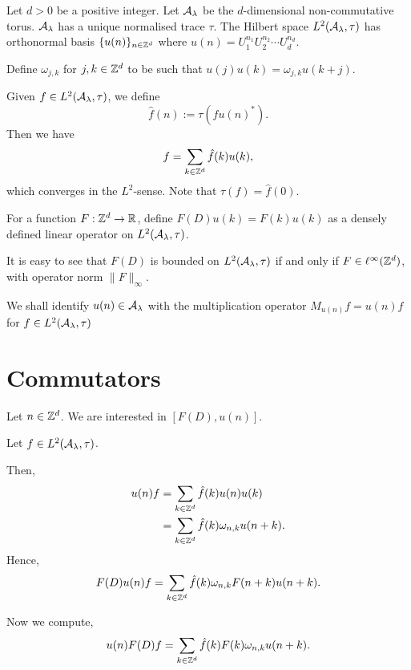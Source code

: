Let $d > 0$ be a positive integer. 
Let $\mathcal{A}_{\lambda}$ be the $d$-dimensional non-commutative torus.
$\mathcal{A}_\lambda$ has a unique normalised trace $\tau$.
The Hilbert space $L^2(\mathcal{A}_\lambda,\tau)$ 
has orthonormal basis $\{u(n)\}_{n \in \mathbb{Z}^d}$ where $u(n) = U_1^{n_1}U_2^{n_2}\cdots U_d^{n_d}$.

Define $\omega_{j,k}$ for $j,k \in \mathbb{Z}^d$ to be such
that $u(j)u(k) = \omega_{j,k}u(k+j)$.

Given $f \in L^2(\mathcal{A}_\lambda,\tau)$, we define
\begin{equation}
    \hat{f}(n) := \tau(fu(n)^*).
\end{equation}
Then we have
\begin{equation}
    f = \sum_{k \in \mathbb{Z}^d} \hat{f}(k)u(k),
\end{equation}
which converges in the $L^2$-sense. Note that $\tau(f) = \hat{f}(0)$.

For a function $F:\mathbb{Z}^d\rightarrow \mathbb{R}$, define $F(D) u(k) = F(k)u(k)$
as a densely defined linear operator on $L^2(\mathcal{A}_\lambda,\tau)$. 

It is easy to see that $F(D)$ is bounded on $L^2(\mathcal{A}_\lambda,\tau)$
if and only if $F \in \ell^\infty(\mathbb{Z}^d)$, with operator norm
$\|F\|_\infty$.

We shall identify $u(n) \in \mathcal{A}_\lambda$ with the multiplication operator
$M_{u(n)}f = u(n)f$ for $f \in L^2(\mathcal{A}_\lambda,\tau)$

\section{Commutators}
\label{commutators}
Let $n \in \mathbb{Z}^d$. We are interested in $[F(D),u(n)]$. 

Let $f \in L^2(\mathcal{A}_\lambda,\tau)$. 

Then,
\begin{align}
    u(n)f &= \sum_{k \in \mathbb{Z}^d} \hat{f}(k)u(n)u(k)\\
          &= \sum_{k \in \mathbb{Z}^d} \hat{f}(k)\omega_{n,k} u(n+k).
\end{align}
Hence,
\begin{equation}
    F(D) u(n)f = \sum_{k \in \mathbb{Z}^d} \hat{f}(k) \omega_{n,k} F(n+k) u(n+k).
\end{equation}

Now we compute,
\begin{equation}
    u(n)F(D)f = \sum_{k \in \mathbb{Z}^d} \hat{f}(k) F(k) \omega_{n,k} u(n+k).
\end{equation}

